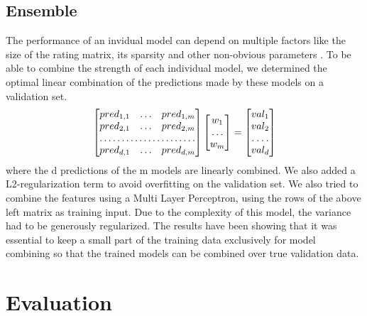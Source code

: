 \documentclass[10pt,conference,compsocconf]{IEEEtran}
\begin{document}
\subsection{Ensemble}

The performance of an invidual model can depend on multiple factors like the size of the rating matrix, its sparsity and other non-obvious parameters \cite{comparative}. 
To be able to combine the strength of each individual model, we determined the optimal linear combination of the predictions made by these models on a validation set. 
\[
\begin{bmatrix}
    pred_{1,1}  & \hdots & pred_{1,m}\\
    pred_{2,1}  & \hdots & pred_{2,m}\\
    \hdotsfor{3} \\
    pred_{d,1}  & \hdots & pred_{d,m}
\end{bmatrix}
\begin{bmatrix}
    w_{1}\\
    \hdots \\
    w_{m}\\
\end{bmatrix}
=
\begin{bmatrix}
    val_{1}\\
    val_{2}\\
    \hdotsfor{1} \\
    val_{d}
\end{bmatrix}
\]
where the d predictions of the m models are linearly combined. We also added a L2-regularization term to avoid overfitting on the validation set. 
\newline
We also tried to combine the features using a Multi Layer Perceptron, using the rows of the above left matrix as training input. Due to the complexity of this model, the variance had to be generously regularized. 
\newline
The results have been showing that it was essential to keep a small part of the training data exclusively for model combining so that the trained models can be combined over true validation data.  

\section{Evaluation}
\label{res}
\end{document}
